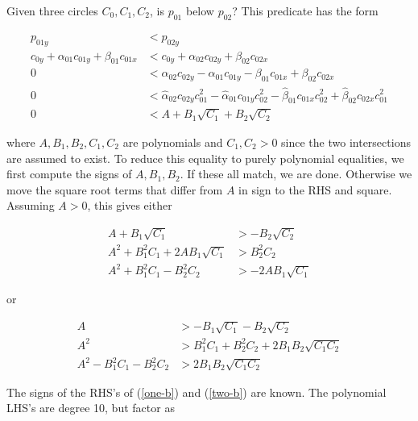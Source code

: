 \documentclass[11pt]{article}
\newcommand{\halpha}{\hat{\alpha}}
\newcommand{\hbeta}{\hat{\beta}}
\begin{document}
Given three circles $C_0,C_1,C_2$, is $p_{01}$ below $p_{02}$?  This predicate has the form
\begin{linenomath*}
\begin{align*}
p_{01y} &< p_{02y} \\
c_{0y} + \alpha_{01} c_{01y} + \beta_{01} c_{01x} &< c_{0y} + \alpha_{02} c_{02y} + \beta_{02} c_{02x} \\
0 &< \alpha_{02} c_{02y} - \alpha_{01} c_{01y} - \beta_{01} c_{01x} + \beta_{02} c_{02x} \\
0 &< \halpha_{02} c_{02y} c_{01}^2 - \halpha_{01} c_{01y} c_{02}^2 - \hbeta_{01} c_{01x} c_{02}^2+ \hbeta_{02} c_{02x} c_{01}^2 \\
0 &< A + B_1 \sqrt{C_1} + B_2 \sqrt{C_2}
\end{align*}
\end{linenomath*}
where $A,B_1,B_2,C_1,C_2$ are polynomials and $C_1, C_2 > 0$ since the two intersections are assumed to exist.  To reduce this equality to
purely polynomial equalities, we first compute the signs of $A, B_1, B_2$.  If these all match, we are done.  Otherwise we move the square root
terms that differ from $A$ in sign to the RHS and square.  Assuming $A > 0$, this gives either
\begin{linenomath*}
\begin{align}
A + B_1 \sqrt{C_1} &> -B_2 \sqrt{C_2} \nonumber \\
A^2 + B_1^2 C_1 + 2 A B_1 \sqrt{C_1} &> B_2^2 C_2 \nonumber \\
A^2 + B_1^2 C_1 - B_2^2 C_2 &> -2 A B_1 \sqrt{C_1} \label{one-b}
\end{align}
\end{linenomath*}
or
\begin{linenomath*}
\begin{align}
A &> -B_1 \sqrt{C_1} - B_2 \sqrt{C_2} \nonumber \\
A^2 &> B_1^2 C_1 + B_2^2 C_2 + 2 B_1 B_2 \sqrt{C_1 C_2} \nonumber \\
A^2 - B_1^2 C_1 - B_2^2 C_2 &> 2 B_1 B_2 \sqrt{C_1 C_2} \label{two-b}
\end{align}
\end{linenomath*}
The signs of the RHS's of (\ref{one-b}) and (\ref{two-b}) are known.  The polynomial LHS's are degree 10, but factor as
\end{document}
